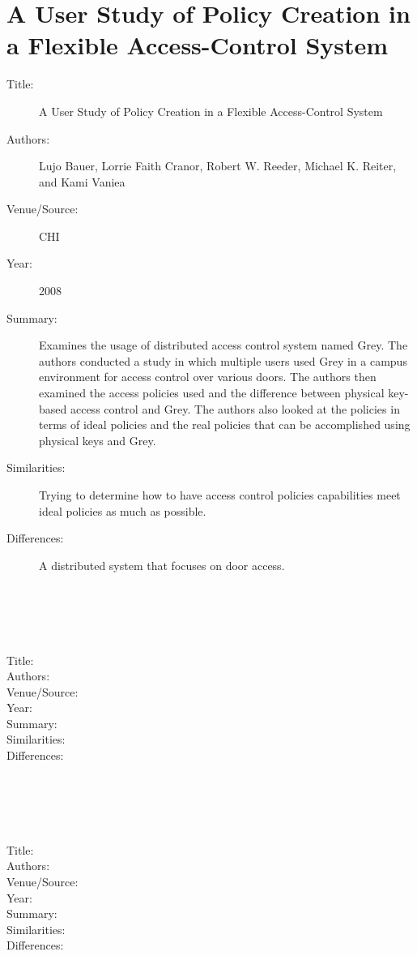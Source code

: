 \documentclass[letterpaper,12pt]{article}
\begin{document}
\section{A User Study of Policy Creation in a Flexible Access-Control System~\cite{policyCreation}}
\begin{description}
 \item[Title:] A User Study of Policy Creation in a Flexible Access-Control System
 \item[Authors:] Lujo Bauer, Lorrie Faith Cranor, Robert W. Reeder, Michael K. Reiter, and Kami Vaniea
 \item[Venue/Source:] CHI
 \item[Year:] 2008
 \item[Summary:] Examines the usage of distributed access control system named Grey.  The authors conducted a study in which multiple users used Grey in a campus environment for access control over various doors.  The authors then examined the access policies used and the difference between physical key-based access control and Grey.  The authors also looked at the policies in terms of ideal policies and the real policies that can be accomplished using physical keys and Grey.
 \item[Similarities:] Trying to determine how to have access control policies capabilities meet ideal policies as much as possible.
 \item[Differences:] A distributed system that focuses on door access.
\end{description}

\section{~\cite{}}
\begin{description}
 \item[Title:] 
 \item[Authors:] 
 \item[Venue/Source:] 
 \item[Year:] 
 \item[Summary:] 
 \item[Similarities:] 
 \item[Differences:] 
\end{description}

\section{~\cite{}}
\begin{description}
 \item[Title:] 
 \item[Authors:] 
 \item[Venue/Source:] 
 \item[Year:] 
 \item[Summary:] 
 \item[Similarities:] 
 \item[Differences:] 
\end{description}



\end{document}
